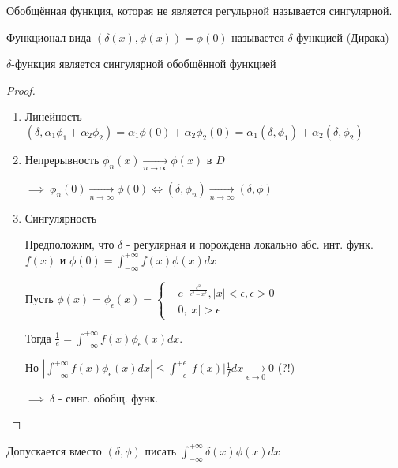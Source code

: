 \documentclass{article}
\begin{document}
\begin{definition}
  Обобщённая функция, которая не является регульрной называется сингулярной.
\end{definition}
\begin{definition}
  Функционал вида $(\delta(x),\phi(x))=\phi(0)$ называется $\delta$-функцией (Дирака)
\end{definition}
\begin{theorem}
  $\delta$-функция является сингулярной обобщённой функцией
\end{theorem}
\begin{proof}
  \phantom{.}

  \begin{enumerate}
    \item Линейность $(\delta,\alpha_1\phi_1+\alpha_2\phi_2)=\alpha_1\phi(0)+\alpha_2\phi_2(0)=\alpha_1(\delta,\phi_1)+\alpha_2(\delta,\phi_2)$
    \item Непрерывность $\phi_n(x) \underset{n\to \infty}{\to}\phi(x)$ в $D$

      $\implies \ \phi_n(0)\underset{n\to\infty}{\to}\phi(0) \iff (\delta,\phi_n)\underset{n\to\infty}{\to}(\delta,\phi)$
    \item Сингулярность

      Предположим, что $\delta$ - регулярная и порождена локально абс. инт. функ. $f(x)$
      и $\phi(0)=\int_{-\infty}^{+\infty}f(x)\phi(x)dx$

      Пусть $\phi(x)=\phi_\epsilon(x)=\left\{\begin{aligned}
        & e^{-\frac{\epsilon^{2}}{\epsilon^{2}-x^{2}}}, |x|<\epsilon, \epsilon>0 \\ 
        & 0, |x|> \epsilon
      \end{aligned}\right.$

      Тогда $\frac{1}{e}=\int_{-\infty}^{+\infty}f(x)\phi_\epsilon(x)dx$.

      Но $|\int_{-\infty}^{+\infty}f(x)\phi_\epsilon(x)dx| \le \int_{-\epsilon}^{+\epsilon}|f(x)|\frac{1}{f}dx \underset{\epsilon\to 0}{\to}0$ (?!)
      
      $\implies \ \delta$ - синг. обобщ. функ.
  \end{enumerate}
\end{proof}
\begin{remark}
  Допускается вместо $(\delta,\phi)$ писать $\int_{-\infty}^{+\infty}\delta(x)\phi(x)dx$
\end{remark}
\end{document}
